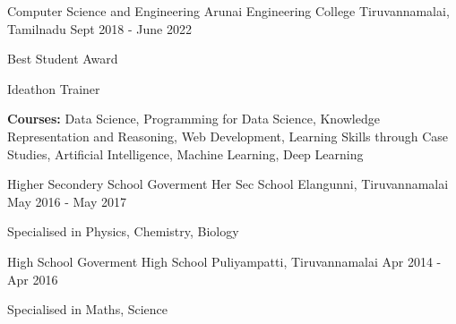 

\begin{cventries}

  \cventry
    {Computer Science and Engineering} %
    {Arunai Engineering College} %
    {Tiruvannamalai, Tamilnadu} %
    {Sept 2018 - June 2022} %
    {
      \begin{cvitems} %
        \item {Best Student Award }
        \item {Ideathon Trainer}
        \item {\textbf{Courses:} Data Science, Programming for Data Science, Knowledge Representation and Reasoning, Web Development, Learning Skills through Case Studies, Artificial Intelligence, Machine Learning, Deep Learning}
      \end{cvitems}
    }
    
  \cventry
    {Higher Secondery School} %
    {Goverment Her Sec School} %
    {Elangunni, Tiruvannamalai} %
    {May 2016 - May 2017} %
    {
      \begin{cvitems} %
        \item {Specialised in Physics, Chemistry, Biology}
      \end{cvitems}
    }
    
  \cventry
    {High School} %
    {Goverment High School} %
    {Puliyampatti, Tiruvannamalai} %
    {Apr 2014 - Apr 2016} %
    {
      \begin{cvitems} %
        \item {Specialised in Maths, Science}
      \end{cvitems}
    }
\end{cventries}
